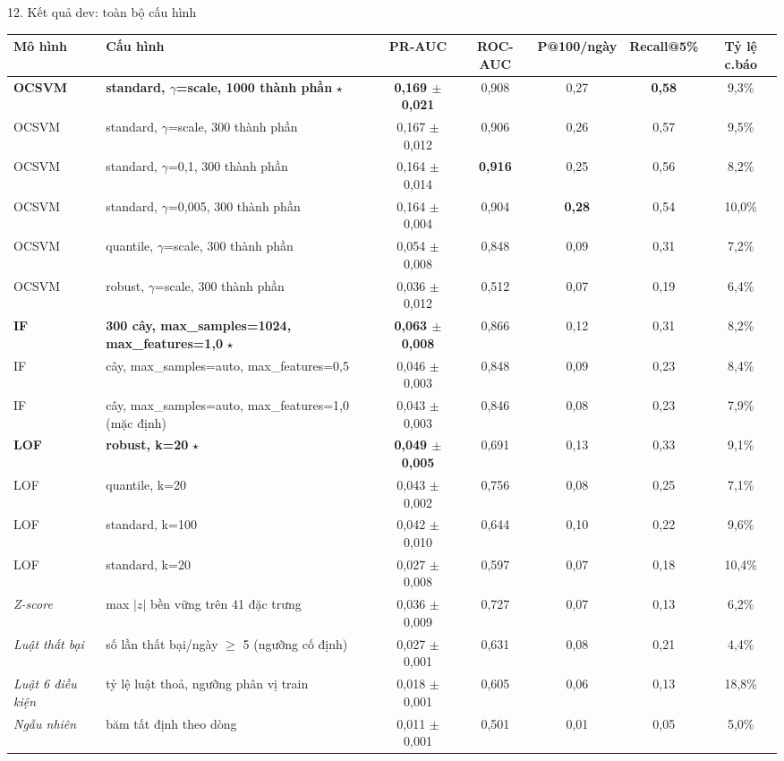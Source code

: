 \documentclass[aspectratio=169, 10pt]{beamer}
\renewcommand{\arraystretch}{1.18}
\begin{document}
\begin{frame}{12. Kết quả dev: toàn bộ cấu hình}
\fontsize{6.6}{7.6}\selectfont
\renewcommand{\arraystretch}{1.08}
\begin{tabularx}{\linewidth}{@{}l>{\raggedright\arraybackslash}Xccccc@{}}
\toprule\rowcolor{socblue!10}\textbf{Mô hình} & \textbf{Cấu hình} & \textbf{PR-AUC} & \textbf{ROC-AUC} & \textbf{P@100/ngày} & \textbf{Recall@5\%} & \textbf{Tỷ lệ c.báo}\\\midrule
\rowcolor{socteal!10}\textbf{OCSVM} & \textbf{standard, $\gamma$=scale, 1000 thành phần} $\star$ & \textbf{0,169 $\pm$ 0,021} & 0,908 & 0,27 & \textbf{0,58} & 9,3\%\\
OCSVM & standard, $\gamma$=scale, 300 thành phần & 0,167 $\pm$ 0,012 & 0,906 & 0,26 & 0,57 & 9,5\%\\
OCSVM & standard, $\gamma$=0,1, 300 thành phần & 0,164 $\pm$ 0,014 & \textbf{0,916} & 0,25 & 0,56 & 8,2\%\\
OCSVM & standard, $\gamma$=0,005, 300 thành phần & 0,164 $\pm$ 0,004 & 0,904 & \textbf{0,28} & 0,54 & 10,0\%\\
OCSVM & quantile, $\gamma$=scale, 300 thành phần & 0,054 $\pm$ 0,008 & 0,848 & 0,09 & 0,31 & 7,2\%\\
OCSVM & robust, $\gamma$=scale, 300 thành phần & 0,036 $\pm$ 0,012 & 0,512 & 0,07 & 0,19 & 6,4\%\\\midrule
\rowcolor{socteal!10}\textbf{IF} & \textbf{300 cây, max\_samples=1024, max\_features=1,0} $\star$ & \textbf{0,063 $\pm$ 0,008} & 0,866 & 0,12 & 0,31 & 8,2\%\\
IF & 150 cây, max\_samples=auto, max\_features=0,5 & 0,046 $\pm$ 0,003 & 0,848 & 0,09 & 0,23 & 8,4\%\\
IF & 150 cây, max\_samples=auto, max\_features=1,0 (mặc định) & 0,043 $\pm$ 0,003 & 0,846 & 0,08 & 0,23 & 7,9\%\\\midrule
\rowcolor{socteal!10}\textbf{LOF} & \textbf{robust, k=20} $\star$ & \textbf{0,049 $\pm$ 0,005} & 0,691 & 0,13 & 0,33 & 9,1\%\\
LOF & quantile, k=20 & 0,043 $\pm$ 0,002 & 0,756 & 0,08 & 0,25 & 7,1\%\\
LOF & standard, k=100 & 0,042 $\pm$ 0,010 & 0,644 & 0,10 & 0,22 & 9,6\%\\
LOF & standard, k=20 & 0,027 $\pm$ 0,008 & 0,597 & 0,07 & 0,18 & 10,4\%\\\midrule
\textit{Z-score} & max $|z|$ bền vững trên 41 đặc trưng & 0,036 $\pm$ 0,009 & 0,727 & 0,07 & 0,13 & 6,2\%\\
\textit{Luật thất bại} & số lần thất bại/ngày $\geq$ 5 (ngưỡng cố định) & 0,027 $\pm$ 0,001 & 0,631 & 0,08 & 0,21 & 4,4\%\\
\textit{Luật 6 điều kiện} & tỷ lệ luật thoả, ngưỡng phân vị train & 0,018 $\pm$ 0,001 & 0,605 & 0,06 & 0,13 & 18,8\%\\
\textit{Ngẫu nhiên} & băm tất định theo dòng & 0,011 $\pm$ 0,001 & 0,501 & 0,01 & 0,05 & 5,0\%\\\bottomrule
\end{tabularx}
\par\vspace{.2em}

\end{frame}
\end{document}
